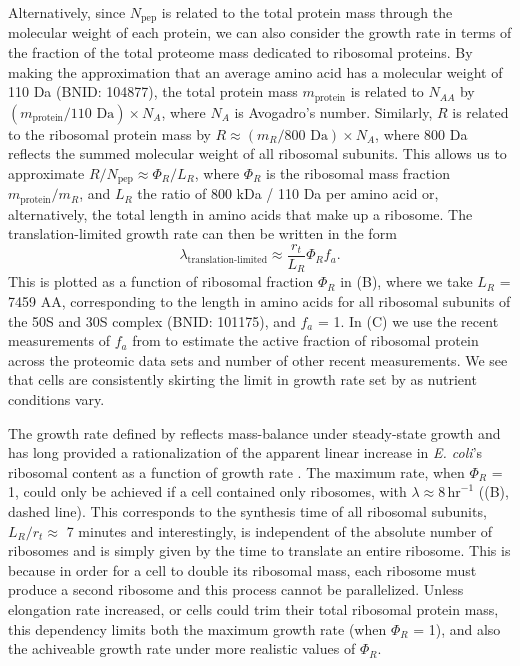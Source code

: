 Alternatively, since $N_\text{pep}$ is related to the total protein mass through
the molecular weight of each protein, we can also consider the growth rate in
terms of the fraction of the total proteome mass dedicated to ribosomal
proteins. By making the approximation that an average amino acid has a molecular
weight of 110 Da (BNID: 104877), the total protein mass $m_{\textrm{protein}}$
is related to $N_{AA}$ by $(m_{\textrm{protein}}/\text{110 Da}) \times N_A$,
where $N_A$ is Avogadro's number. Similarly, $R$ is related to the ribosomal
protein mass by $R \approx (m_R/\text{800 Da}) \times N_A$, where 800 Da
reflects the summed molecular weight of all ribosomal subunits.  This allows us
to approximate  $R / N_\text{pep} \approx \Phi_R / L_R$,  where $\Phi_R$ is the
ribosomal mass fraction $m_{\textrm{protein}}/m_R$, and $L_R$ the ratio of 800
kDa / 110 Da per amino acid or, alternatively, the total length in amino acids
that make up a ribosome. The translation-limited growth rate can then be written
in the form
\begin{equation}
\lambda_{\textrm{translation-limited}} \approx \frac{r_t}{L_R}  \Phi_R f_a.
\label{eq:translation_limit_growth_rate}
\end{equation}
This is plotted as a function of ribosomal fraction $\Phi_R$ in
(B), where we take $L_R$ = 7459 AA, corresponding to the
length in amino acids for all ribosomal subunits of the 50S and 30S complex
(BNID: 101175), and $f_a$ = 1. In (C) we use the
recent measurements of $f_a$ from \cite{dai2016} to estimate the active fraction of
ribosomal protein across the proteomic data sets and number of other recent
measurements. We see that cells are consistently skirting the limit in growth
rate set by  as nutrient conditions vary.

The growth rate defined by  reflects
mass-balance under steady-state growth and has long provided a rationalization
of the apparent linear increase in \textit{E. coli}'s ribosomal content as a
function of growth rate \citep{goldberger1979, scott2010}. The maximum rate,
when $\Phi_R$ = 1, could only be achieved if a cell contained only ribosomes,
with $\lambda \approx 8 \,\text{hr}^{-1}$ ((B), dashed
line). This corresponds to the synthesis time of all ribosomal subunits, $L_R/
r_t \approx$ 7 minutes \citep{dill2011} and interestingly, is independent of
the absolute number of ribosomes and is simply given by the time to translate an
entire ribosome.  This is because in order for a cell to double its ribosomal mass,
each ribosome must produce a second ribosome and this process cannot be parallelized.
Unless elongation rate increased, or cells could trim their total ribosomal
protein mass, this dependency limits both the maximum growth rate (when $\Phi_R$
= 1), and also the achiveable growth rate under more realistic values of $\Phi_R$.

